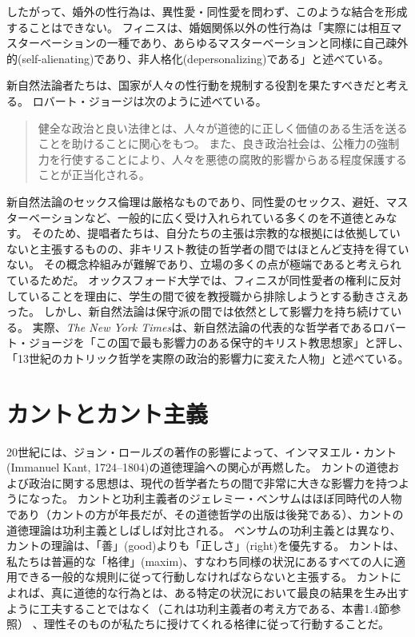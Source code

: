 \documentclass[paper=a4,book,openany]{jlreq} \usepackage{mystyle}
\begin{document}
したがって、婚外の性行為は、異性愛・同性愛を問わず、このような結合を形成することはできない。
フィニスは、婚姻関係以外の性行為は「実際には相互マスターベーションの一種であり、あらゆるマスターベーションと同様に自己疎外的(self-alienating)であり、非人格化(depersonalizing)である」と述べている\citep[p.1066]{finnis94:_law_moral_sexual_orien}。

新自然法論者たちは、国家が人々の性行動を規制する役割を果たすべきだと考える。
ロバート・ジョージは次のように述べている。

\begin{quote}
健全な政治と良い法律とは、人々が道徳的に正しく価値のある生活を送ることを助けることに関心をもつ。
また、良き政治社会は、公権力の強制力を行使することにより、人々を悪徳の腐敗的影響からある程度保護することが正当化される。
\citep[p.20]{george93:_makin_men_moral}
\end{quote}

新自然法論のセックス倫理は厳格なものであり、同性愛のセックス、避妊、マスターベーションなど、一般的に広く受け入れられている多くのを不道徳とみなす。
そのため、提唱者たちは、自分たちの主張は宗教的な根拠には依拠していないと主張するものの、非キリスト教徒の哲学者の間ではほとんど支持を得ていない。
その概念枠組みが難解であり、立場の多くの点が極端であると考えられているためだ。
オックスフォード大学では、フィニスが同性愛者の権利に反対していることを理由に、学生の間で彼を教授職から排除しようとする動きさえあった\citep{benn19:_we_dont_think_john_finnis}。
しかし、新自然法論は保守派の間では依然として影響力を持ち続けている。
実際、\emph{The New York Times}は、新自然法論の代表的な哲学者であるロバート・ジョージを「この国で最も影響力のある保守的キリスト教思想家」と評し、「13世紀のカトリック哲学を実際の政治的影響力に変えた人物」と述べている\citep{kirkpatrick09:_conser_chris_big_think}。

\section{カントとカント主義}

20世紀には、ジョン・ロールズの著作の影響によって、インマヌエル・カント(Immanuel Kant, 1724--1804)の道徳理論への関心が再燃した。
カントの道徳および政治に関する思想は、現代の哲学者たちの間で非常に大きな影響力を持つようになった。
カントと功利主義者のジェレミー・ベンサムはほぼ同時代の人物であり（カントの方が年長だが、その道徳哲学の出版は後発である）、カントの道徳理論は功利主義としばしば対比される。
ベンサムの功利主義とは異なり、カントの理論は、「善」(good)よりも「正しさ」(right)を優先する。
カントは、私たちは普遍的な「格律」(maxim)、すなわち同様の状況にあるすべての人に適用できる一般的な規則に従って行動しなければならないと主張する。
カントによれば、真に道徳的な行為とは、ある特定の状況において最良の結果を生み出すように工夫することではなく（これは功利主義者の考え方である、本書1.4節参照） 、理性そのものが私たちに授けてくれる格律に従って行動することだ。
\end{document}
